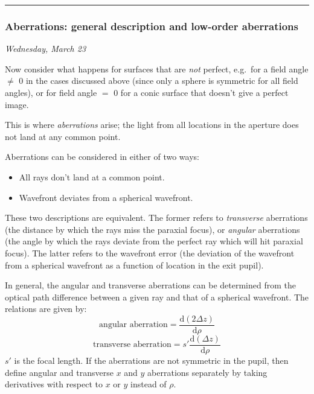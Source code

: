 \documentclass[12pt]{article}
\begin{document}
\rule{\textwidth}{0.4pt}

\subsubsection{Aberrations: general description and low-order aberrations}

{\small\hfill\emph{Wednesday, March 23}}

Now consider what happens for surfaces that are \emph{not} perfect, e.g.\ for
a field angle $\neq$ 0 in the cases discussed above
(since only a sphere is symmetric for all field angles),
or for field angle $=$ 0 for a conic
surface that doesn't give a perfect image.

This is where \emph{aberrations} arise;
the light from all locations in the aperture
does not land at any common point.

Aberrations can be considered in either of two ways:
\begin{itemize}
    \item All rays don't land at a common point.
    \item Wavefront deviates from a spherical wavefront.
\end{itemize}
These two descriptions are equivalent. The former refers to
\emph{transverse} aberrations (the distance by which the
rays miss the paraxial focus), or \emph{angular} aberrations
(the angle by which the rays deviate from the perfect ray which will hit
paraxial focus). The latter refers to the wavefront error
(the deviation of the wavefront from a spherical wavefront as a
function of location in the exit pupil).

In general, the angular and transverse aberrations can be determined
from the optical path difference between a given ray and that of a
spherical wavefront. The relations are given by:{$$
    \textrm{angular aberration} =
    \frac{\textrm{d}\left(2\Delta{z}\right)}{\textrm{d}\rho}$$ $$
    \textrm{transverse aberration} =
    s'\frac{\textrm{d}\left(\Delta{z}\right)}{\textrm{d}\rho}
$$}$s'$ is the focal length.
If the aberrations are not symmetric in the pupil, then
define angular and transverse $x$ and $y$ aberrations separately by taking
derivatives with respect to $x$ or $y$ instead of $\rho$.
\end{document}
